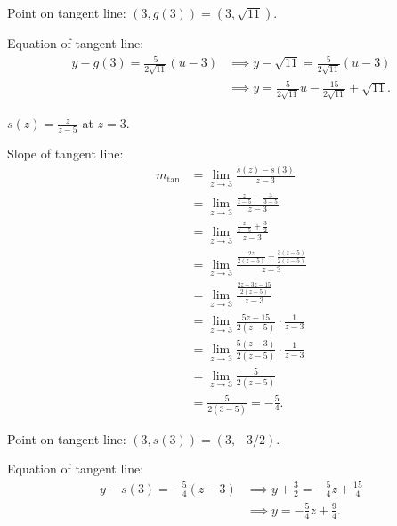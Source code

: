\documentclass[nooutcomes]{ximera}
\renewenvironment{freeResponse}{
\ifhandout\setbox0\vbox\bgroup\else
\begin{trivlist}\item[\hskip \labelsep\bfseries Solution:\hspace{2ex}]
\fi}
{\ifhandout\egroup\else
\end{trivlist}
\fi}
\begin{document}
\begin{problem}
\begin{itemize}
\begin{freeResponse}
        Point on tangent line: $(3, g(3)) = (3, \sqrt{11})$.

        Equation of tangent line:
        \begin{align*}
          y - g(3) = \frac{5}{2\sqrt{11}}(u-3)
          &\implies y - \sqrt{11} = \frac{5}{2\sqrt{11}}(u - 3)\\
          &\implies y = \frac{5}{2\sqrt{11}}u - \frac{15}{2\sqrt{11}} + \sqrt{11}.
        \end{align*}
      \end{freeResponse}

    \item[(c)]
      $\displaystyle s(z) = \frac{z}{z-5}$ at $z = 3$.
      \begin{freeResponse}
        Slope of tangent line:
        \begin{align*}
          m_{\mathrm{tan}}
          &= \lim_{z \to 3} \frac{s(z) - s(3)}{z-3}  \\
		&= \lim_{z \to 3} \frac{\frac{z}{z-5} - \frac{3}{3-5}}{z-3}  \\
		&= \lim_{z \to 3} \frac{\frac{z}{z-5} + \frac{3}{2}}{z-3}  \\
		&= \lim_{z \to 3} \frac{\frac{2z}{2(z-5)} + \frac{3(z-5)}{2(z-5)}}{z-3}  \\
		&= \lim_{z \to 3} \frac{\frac{2z + 3z - 15}{2(z-5)}}{z-3}  \\
		&= \lim_{z \to 3} \frac{5z-15}{2(z-5)} \cdot \frac{1}{z-3}  \\
		&= \lim_{z \to 3} \frac{5(z-3)}{2(z-5)} \cdot \frac{1}{z-3}  \\
		&= \lim_{z \to 3} \frac{5}{2(z-5)}  \\
		&= \frac{5}{2(3-5)} = -\frac{5}{4}.
	\end{align*}

        Point on tangent line: $(3, s(3)) = (3, -3/2)$.

        Equation of tangent line:
        \begin{align*}
          y - s(3) = - \frac{5}{4}(z-3) &\implies y + \frac{3}{2} = - \frac{5}{4}z + \frac{15}{4}\\
          &\implies y = - \frac{5}{4} z + \frac{9}{4}.
        \end{align*}
      \end{freeResponse}
  \end{itemize}
\end{problem}
\end{document}
